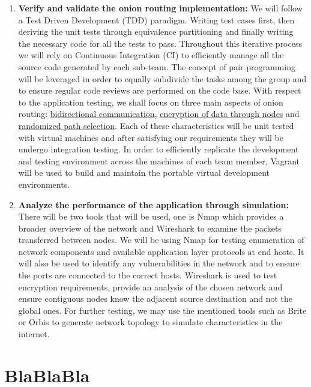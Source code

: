 \documentclass{article}
\begin{document}
\begin{enumerate}
    \item \textbf{Verify and validate the onion routing implementation:} We will follow a Test Driven Development (TDD) paradigm. Writing test cases first, then deriving the unit tests through equivalence partitioning and finally writing the necessary code for all the tests to pass. Throughout this iterative process we will rely on Continuous Integration (CI) to efficiently manage all the source code generated by each sub-team. The concept of pair programming will be leveraged in order to equally subdivide the tasks among the group and to ensure regular code reviews are performed on the code base. With respect to the application testing, we shall focus on three main aspects of onion routing: \underline{bidirectional communication}, \underline{encryption of data through nodes} and \underline{randomized path selection}. Each of these characteristics will be unit tested with virtual machines and after satisfying our requirements they will be undergo integration testing. In order to efficiently replicate the development and testing environment across the machines of each team member, Vagrant will be used to build and maintain the portable virtual development environments.
    \item \textbf{Analyze the performance of the application through simulation:} There will be two tools that will be used, one is Nmap  which provides a broader overview of the network and Wireshark to examine the packets transferred between nodes. We will be using Nmap for testing enumeration of network components and available application layer protocols at end hosts. It will also be used to identify any vulnerabilities in the network and to ensure the ports are connected to the correct hosts. Wireshark is used to test encryption requirements, provide an analysis of the chosen network and ensure contiguous nodes know the adjacent source destination and not the global ones. For further testing, we may use the mentioned tools such as Brite or Orbis to generate network topology to simulate characteristics in the internet.
    

\end{enumerate}


\section*{BlaBlaBla}
\end{document}
